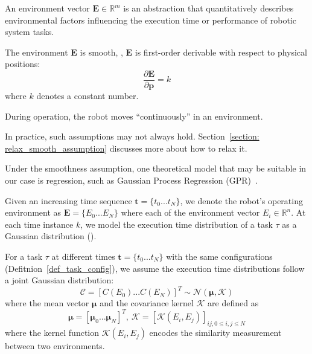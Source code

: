 \begin{definition}
    An environment vector $\textbf{E} \in \mathbb{R}^m$ is an abstraction that quantitatively describes environmental factors influencing the execution time or performance of robotic system tasks.
\end{definition}
    \begin{assumption}
    \label{env_smooth_assumption}
    The environment $\textbf{E}$ is smooth, \ie, $\textbf{E}$ is first-order derivable with respect to physical positions:
    \begin{equation}
        \frac{\partial \textbf{E}}{\partial \textbf{p}} = k
    \end{equation}
    where $k$ denotes a constant number.
    \end{assumption}
    \begin{assumption}
        During operation, the robot moves ``continuously'' in an environment.
    \end{assumption}

    In practice, such assumptions may not always hold. Section~\ref{section: relax_smooth_assumption} discusses more about how to relax it.

    Under the smoothness assumption, one theoretical model that may be suitable in our case is regression, such as Gaussian Process Regression (GPR)~\cite{Rasmussen2005GaussianPF}. 
    
    
    
	Given an increasing time sequence $\bm{t}=\{t_0 ... t_N\}$, we denote the robot's operating environment as $\bm{E}=\{E_0 ... E_N\}$ where each of the environment vector $E_i \in \mathbb{R}^{n}$. At each time instance $k$, we model the execution time distribution of a task $\tau$ as a Gaussian distribution ().
    
	For a task $\tau$ at different times $\bm{t}=\{t_0 ... t_N\}$ with the same configurations (Defitnion~\ref{def_task_config}), we assume the execution time distributions follow a joint Gaussian distribution:
	\begin{equation}
		\bm{\mathcal{C}} = [C(E_0) ... C(E_N)]^T \sim \mathcal{N}(\bm{\mu}, \bm{\mathcal{K}})
	\end{equation}
	where the mean vector $\bm{\mu}$ and the covariance kernel $\bm{\mathcal{K}}$ are defined as
	\begin{equation}
		\bm{\mu}=[\bm{\mu}_0 ... \bm{\mu}_N]^T, \ 
		\bm{\mathcal{K}} = [\mathcal{K}(E_i, E_j)]_{ij, 0 \leq i,j \leq N}
	\end{equation}
	where the kernel function $\mathcal{K}(E_i, E_j)$  encodes the similarity measurement between two environments. 

